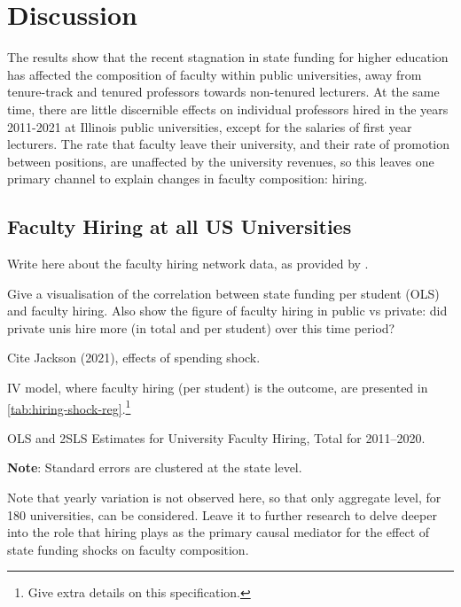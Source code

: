 \section{Discussion}

The results show that the recent stagnation in state funding for higher education has affected the composition of faculty within public universities, away from tenure-track and tenured professors towards non-tenured lecturers.
At the same time, there are little discernible effects on individual professors hired in the years 2011-2021 at Illinois public universities, except for the salaries of first year lecturers.
The rate that faculty leave their university, and their rate of promotion between positions, are unaffected by the university revenues, so this leaves one primary channel to explain changes in faculty composition: hiring.

\subsection{Faculty Hiring at all US Universities}

Write here about the faculty hiring network data, as provided by \cite{wapman2022quantifying}.

Give a visualisation of the correlation between state funding per student (OLS) and faculty hiring.
Also show the figure of faculty hiring in public vs private: did private unis hire more (in total and per student) over this time period?

Cite Jackson (2021), effects of spending shock.

IV model, where faculty hiring (per student) is the outcome, are presented in \autoref{tab:hiring-shock-reg}.\footnote{
    Give extra details on this specification.
}

\begin{table}[h!]
    \singlespacing
    \centering
    \caption{OLS and 2SLS Estimates for University Faculty Hiring, Total for 2011--2020.}
    \makebox[\textwidth][c]{}
    \begin{flushleft}
        \footnotesize
        \textbf{Note}: Standard errors are clustered at the state level.
    \end{flushleft}
    \label{tab:hiring-shock-reg}
\end{table}

Note that yearly variation is not observed here, so that only aggregate level, for 180 universities, can be considered.
Leave it to further research to delve deeper into the role that hiring plays as the primary causal mediator for the effect of state funding shocks on faculty composition.

